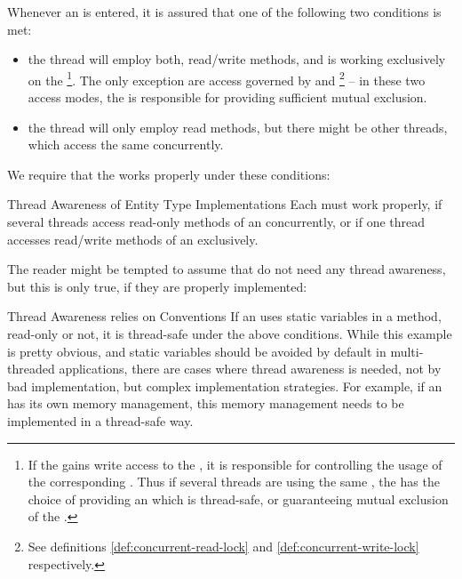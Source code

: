 \documentclass[a4paper, 12pt]{book}
\begin{document}
\begin{samepage}Whenever an  is entered, it is assured
that one of the following two conditions is met:
\begin{itemize}
\item the thread will employ both, read/write methods, and is working
  exclusively on the \footnote{If the  gains
    write access to the , it is responsible for
    controlling the usage of the corresponding . Thus if several
    threads are using the same , the  has the choice of
    providing an  which is thread-safe, or
    guaranteeing mutual exclusion of the .}. The only exception are
  access governed by  and \footnote{See
    definitions \vref{def:concurrent-read-lock} and
    \vref{def:concurrent-write-lock} respectively.} -- in these two access
  modes, the  is responsible for providing sufficient mutual
  exclusion.
\item the thread will only employ read methods, but there might be other
  threads, which access the same  concurrently.
\end{itemize}\end{samepage}
We require that the  works properly under these
conditions: 
\begin{requirement*}{Thread Awareness of Entity Type Implementations}
  \label{req:eti-thread-awareness}
  Each  must work properly, if several threads
  access read-only methods of an  concurrently, or if
  one thread accesses read/write methods of an 
  exclusively.
\end{requirement*}
The reader might be tempted to assume that  do
not need any thread awareness, but this is only true, if they are properly
implemented:
\begin{remark*}{Thread Awareness relies on Conventions}
  If an  uses static variables in a method,
  read-only or not, it is thread-safe under the above conditions. While this
  example is pretty obvious, and static variables should be avoided by default
  in multi-threaded applications, there are cases where thread awareness is
  needed, not by bad implementation, but complex implementation
  strategies. For example, if an  has its own
  memory management, this memory management needs to be implemented in a
  thread-safe way.
\end{remark*}
\end{document}
